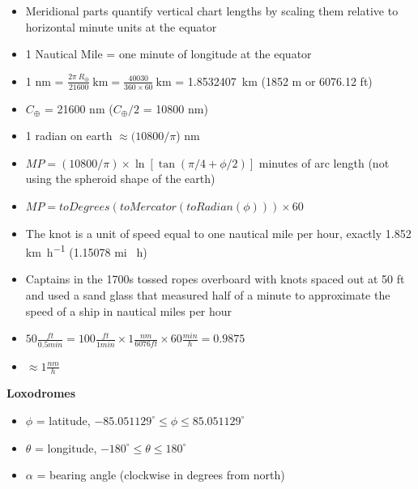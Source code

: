 \documentclass[conference]{IEEEtran}
\begin{document}
\begin{itemize}
\item Meridional parts quantify vertical chart lengths by scaling them relative to horizontal minute units at the equator
\item 1 Nautical Mile = one minute of longitude at the equator
\item 1 nm = $\frac{2\pi\ R_{\oplus}}{21600}\ \si{\km} = \frac{40030}{360 \times 60}\ \si{\km}$ = \num{1.8532407}\ \si{\km} (\num{1852} \si{\meter} or \num{6076.12} ft)
\item $C_{\oplus}$ = 21600 nm ($C_{\oplus}/2$ = 10800 nm)
\item 1 radian on earth $\approx (10800/\pi$) nm
\item $MP = (10800/\pi) \times \ln [\tan (\pi/4 + \phi/2)]$ minutes of arc length (not using the spheroid shape of the earth)
\item $MP = toDegrees(toMercator(toRadian(\phi))) \times 60$
\item The knot is a unit of speed equal to one nautical mile per hour, exactly \num{1.852} \si{\km\per\hour} (\num{1.15078} mi \si{\per\hour})
\item Captains in the 1700s tossed ropes overboard with knots spaced out at 50 ft and used a sand glass
that measured half of a minute to approximate the speed of a ship in nautical miles per hour
\item $50 \frac{ft}{0.5 min} = 100 \frac{ft}{1 min} \times 1 \frac{nm}{6076 ft} \times 60 \frac{min}{h} = 0.9875$
\vspace{0.1cm}
\item[] $\approx 1 \frac{nm}{h}$
\end{itemize}

\vspace{0.5cm}
\textbf{Loxodromes~\cite{Veness26}}

\begin{itemize}
\item $\phi$ = latitude, $-85.051129^\circ \leq \phi \leq 85.051129^\circ$
\item $\theta$ = longitude, $-180^\circ \leq \theta \leq 180^\circ$
\item $\alpha$ = bearing angle (clockwise in degrees from north)
\end{itemize}
\end{document}

